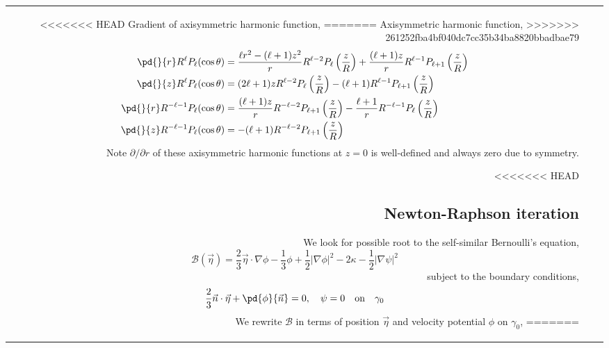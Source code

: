 \documentclass{jfm}
\begin{document}
\begin{table}
\begin{center}
\begin{tabular}{rl|l}
<<<<<<< HEAD
Gradient of axisymmetric harmonic function,
=======
Axisymmetric harmonic function,
>>>>>>> 261252fba4bf040dc7cc35b34ba8820bbadbae79
\begin{align}
\pd{}{r}R^\ell P_\ell(\cos\theta)
&=\frac{ \ell r^2-(\ell +1)z^2 }{r}R^{\ell-2}P_\ell\left(\frac{z}{R}\right)
+\frac{(\ell+1) z }{r} R^{\ell-1}P_{\ell+1}\left(\frac{z}{R}\right)\\
\pd{}{z}R^\ell P_\ell(\cos\theta)
&=(2 \ell+1) z R^{\ell-2} P_\ell\left(\frac{z}{R}\right)-(\ell+1) R^{\ell-1} P_{\ell+1}\left(\frac{z}{R}\right)\\
\pd{}{r}R^{-\ell-1} P_\ell(\cos\theta)&=\frac{(\ell+1) z }{r}R^{-\ell-2} P_{\ell+1}\left(\frac{z}{R}\right)
-\frac{\ell+1 }{r}R^{-\ell-1} P_\ell\left(\frac{z}{R}\right)\\
\pd{}{z}R^{-\ell-1} P_\ell(\cos\theta)&=-(\ell+1) R^{-\ell-2} P_{\ell+1}\left(\frac{z}{R}\right)
\end{align}
Note $\partial /\partial r$ of these axisymmetric harmonic functions at $z=0$ is well-defined and always zero due to symmetry.


<<<<<<< HEAD
\subsection{Newton-Raphson iteration}
We look for possible root to the self-similar Bernoulli's equation,
\begin{equation}
\mathcal{B}(\vec{\eta})=\frac{2}{3}\vec{\eta}\cdot \nabla \phi  -\frac{1}{3}\phi
+\frac{1}{2}|\nabla \phi|^2-2\kappa-\frac{1}{2}|\nabla \psi|^2
\end{equation}
subject to the boundary conditions,
\begin{equation}
\frac{2}{3}\vec{n}\cdot \vec{\eta}+\pd{\phi}{\vec{n}}=0,\quad
\psi =0 \quad\textrm{on}\quad\gamma_0
\end{equation}
We rewrite $\mathcal{B}$ in terms of position $\vec{\eta}$ and velocity potential $\phi$ on $\gamma_0$,
=======

\end{tabular}
\end{center}
\end{table}
\end{document}
